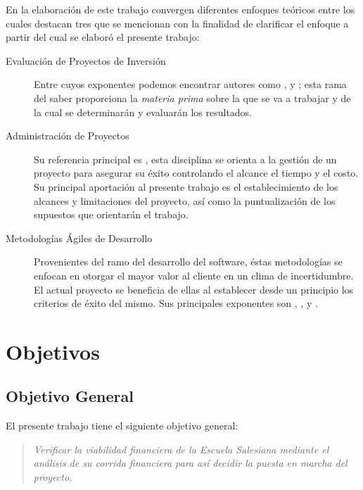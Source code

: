 En la elaboración de este trabajo convergen diferentes enfoques teóricos entre los cuales destacan tres que se mencionan con la finalidad de clarificar el enfoque a partir del cual se elaboró el presente trabajo:

\begin{description}
    \item[Evaluación de Proyectos de Inversión] Entre cuyos exponentes podemos encontrar autores como  \citep{SAPAG2007}, \citep{COSS2000} y \citep{Leland2006}; esta rama del saber proporciona la \emph{materia prima} sobre la que se va a trabajar y de la cual se determinarán y evaluarán los resultados.
    \item[Administración de Proyectos] Su referencia principal es \citep{PMBOK2008}, esta disciplina se orienta a la gestión de un proyecto para asegurar su éxito controlando el alcance el tiempo y el costo. Su principal aportación al presente trabajo es el establecimiento de los alcances y limitaciones del proyecto, así como la puntualización de los supuestos que orientarán el trabajo.
    \item[Metodologías Ágiles de Desarrollo] Provenientes del ramo del desarrollo del software, éstas metodologías se enfocan en otorgar el mayor valor al cliente en un clima de incertidumbre. El actual proyecto se beneficia de ellas al establecer desde un principio los criterios de éxito del mismo. Sus principales exponentes son \citep{AgileManifesto2001}, \citep{Wells2009}, \citep{Scrum2010} y \citep{Poppendieck2001}.
\end{description}

\section{Objetivos}

\subsection{Objetivo General}
\label{sub:ObjetivoGeneral}

El presente trabajo tiene el siguiente objetivo general:

\begin{quote}
	\emph{Verificar la viabilidad financiera de la Escuela Salesiana mediante el análisis de su corrida financiera para así decidir la puesta en marcha del proyecto.}
\end{quote}

